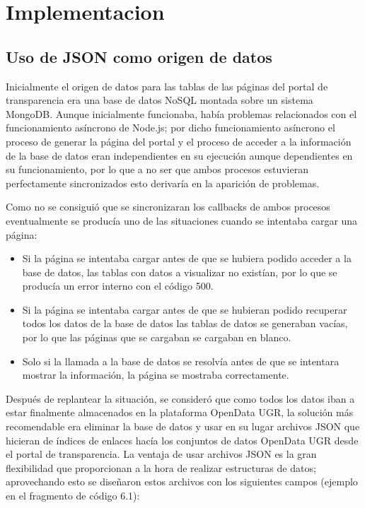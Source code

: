 \chapter{Implementacion}
 
\section{Uso de JSON como origen de datos}
 
Inicialmente el origen de datos para las tablas de las páginas del portal de transparencia era una base de datos NoSQL montada sobre un sistema MongoDB. Aunque inicialmente funcionaba, había problemas relacionados con el funcionamiento asíncrono de Node.js; por dicho funcionamiento asíncrono el proceso de generar la página del portal y el proceso de acceder a la información de la base de datos eran independientes en su ejecución aunque dependientes en su funcionamiento, por lo que a no ser que ambos procesos estuvieran perfectamente sincronizados esto derivaría en la aparición de problemas.

\bigskip
Como no se consiguió que se sincronizaran los callbacks de ambos procesos eventualmente se producía uno de las situaciones cuando se intentaba cargar una página:

\begin{itemize}
	\item Si la página se intentaba cargar antes de que se hubiera podido acceder a la base de datos, las tablas con datos a visualizar no existían, por lo que se producía un error interno con el código 500.
	\item Si la página se intentaba cargar antes de que se hubieran podido recuperar todos los datos de la base de datos las tablas de datos se generaban vacías, por lo que las páginas que se cargaban se cargaban en blanco.
	\item Solo si la llamada a la base de datos se resolvía antes de que se intentara mostrar la información, la página se mostraba correctamente. 
\end{itemize}

Después de replantear la situación, se consideró que como todos los datos iban a estar finalmente almacenados en la plataforma OpenData UGR, la solución más recomendable era eliminar la base de datos y usar en su lugar archivos JSON que hicieran de índices de enlaces hacía los conjuntos de datos OpenData UGR desde el portal de transparencia. La ventaja de usar archivos JSON es la gran flexibilidad que proporcionan a la hora de realizar estructuras de datos; aprovechando esto se diseñaron estos archivos con los siguientes campos (ejemplo en el fragmento de código 6.1):

